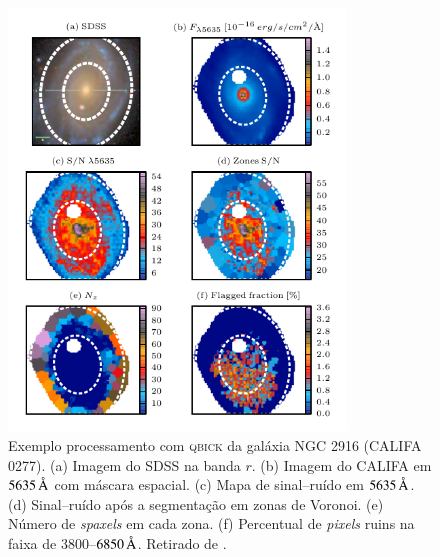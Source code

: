 \begin{figure}
	\includegraphics[width=0.8\textwidth]{figuras/zones-K0277}
	\caption[Exemplo processamento com \textsc{qbick}, galáxia K0277]
	{Exemplo processamento com \textsc{qbick} da galáxia NGC 2916 (CALIFA 0277). (a)
	Imagem do SDSS na banda $r$. (b) Imagem do CALIFA em $5635\,\text{\normalfont\AA}$ com máscara
	espacial. (c) Mapa de sinal--ruído em $5635\,\text{\normalfont\AA}$. (d) Sinal--ruído após
	a segmentação em zonas de Voronoi. (e) Número de {\em spaxels} em cada zona.
	(f) Percentual de {\em pixels} ruins na faixa de $3800$--$6850\,\text{\normalfont\AA}$.
	Retirado de \citet{CidFernandes2013}.}
	\label{fig:QBICK}
\end{figure}

\subsection{\starlight}
\label{sec:ifs:starlight}

